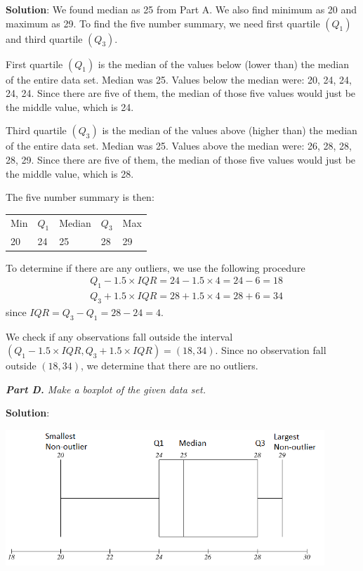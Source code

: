 \documentclass[12pt]{article}
\begin{document}
\textbf{Solution}: We found median as 25 from Part A. We also find minimum as 20 and maximum as 29. To find the five number summary, we need first quartile $(Q_1)$ and third quartile $(Q_3)$.

First quartile $(Q_1)$ is the median of the values below (lower than) the median of the entire data set. Median was 25. Values below the median were: 20, 24, 24, 24, 24. Since there are five of them, the median of those five values would just be the middle value, which is 24.

Third quartile $(Q_3)$ is the median of the values above (higher than) the median of the entire data set. Median was 25. Values above the median were: 26, 28, 28, 28, 29. Since there are five of them, the median of those five values would just be the middle value, which is 28.

The five number summary is then:
\begin{tabular}{lllll}
	Min & $Q_1$ & Median & $Q_3$ & Max \\
	20  & 24      & 25     & 28      & 29
\end{tabular}

To determine if there are any outliers, we use the following procedure
\begin{align*}
	&Q_1 - 1.5 \times IQR = 24 - 1.5 \times 4 = 24 - 6 = 18 \\
	&Q_3 + 1.5 \times IQR = 28 + 1.5 \times 4 = 28 + 6 = 34
\end{align*}
since $IQR = Q_3 - Q_1 = 28 - 24 = 4$.

We check if any observations fall outside the interval $(Q_1 - 1.5 \times IQR, Q_3 + 1.5 \times IQR) = (18, 34)$. Since no observation fall outside $(18,34)$, we determine that there are no outliers.

\textit{\textbf{Part D.} Make a boxplot of the given data set.}

\textbf{Solution}: 

\includegraphics[width=12cm]{Figures/fig8.png}
\end{document}
